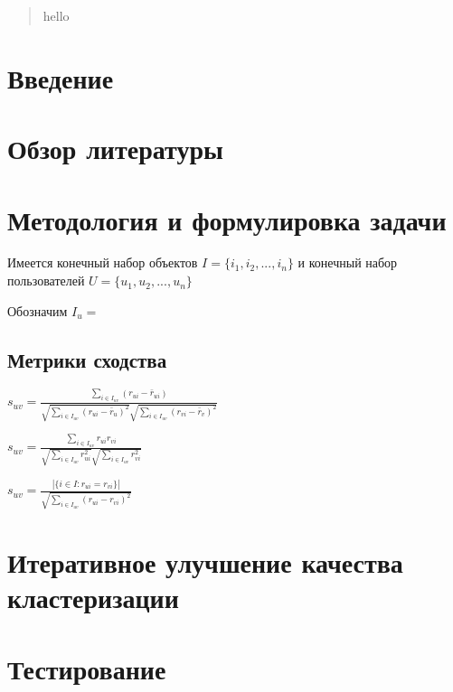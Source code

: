 \documentclass[12pt]{article} %
\begin{document}
\begin{abstract}
hello
\end{abstract}

\section{Введение}
\par

\section{Обзор литературы}

\section{Методология и формулировка задачи}
\par
Имеется конечный набор объектов $I=\{i_{1}, i_{2}, ..., i_{n}\}$ и конечный набор пользователей $U=\{u_{1}, u_{2}, ..., u_{n}\}$

\par
Обозначим $I_{u}= $

\subsection{Метрики сходства}

$s_{uv} = \frac{\sum_{i \in I_{uv}} (r_{ui} - \bar{r}_{ui})}{\sqrt{\sum_{i \in I_{uv}}  (r_{ui} - \bar{r}_{u})^2} \sqrt{\sum_{i \in I_{uv}}  (r_{vi} - \bar{r}_{v})^2}}$

\vspace*{2\baselineskip} %

$s_{uv} = \frac{\sum_{i \in I_{uv}} r_{ui}r_{vi}} {\sqrt{\sum_{i \in I_{uv}} r_{ui}^2} \sqrt{\sum_{i \in I_{uv}} r_{vi}^2}}$

\vspace*{2\baselineskip}

$s_{uv} = \frac{|\{i \in I: r_{ui} = r_{vi}\}|}{\sqrt{\sum_{i \in I_{uv}} (r_{ui} - r_{vi})^2 }}$




\section{Итеративное улучшение качества кластеризации}

\section{Тестирование}
\end{document}
